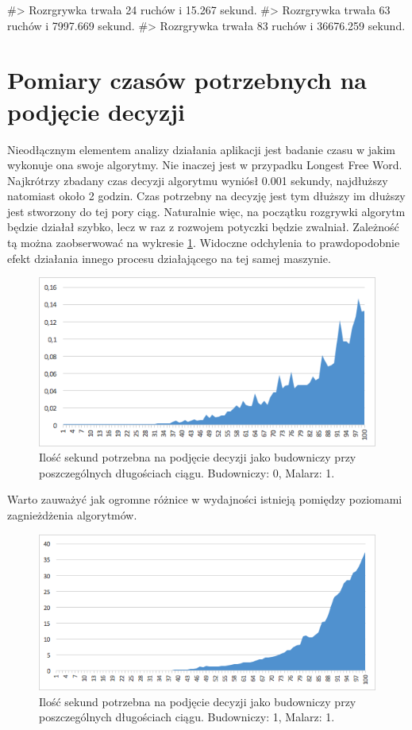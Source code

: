 \documentclass[document]{xmgr}
\begin{document}
#> Rozrgrywka trwała 24 ruchów i 15.267 sekund.
#> Rozrgrywka trwała 63 ruchów i 7997.669 sekund.
#> Rozrgrywka trwała 83 ruchów i 36676.259 sekund.

\fi

\section{Pomiary czasów potrzebnych na podjęcie decyzji}
Nieodłącznym elementem analizy działania aplikacji jest badanie czasu w jakim wykonuje ona swoje algorytmy. Nie inaczej jest w przypadku Longest Free Word. Najkrótrzy zbadany czas decyzji algorytmu wyniósł 0.001 sekundy, najdłuższy natomiast około 2 godzin. Czas potrzebny na decyzję jest tym dłuższy im dłuższy jest stworzony do tej pory ciąg. Naturalnie więc, na początku rozgrywki algorytm będzie działał szybko, lecz w raz z rozwojem potyczki będzie zwalniał. Zależność tą można zaobserwować na wykresie \ref{fig:builder0painter1}. Widoczne odchylenia to prawdopodobnie efekt działania innego procesu działającego na tej samej maszynie.

\begin{figure}[H]
    \centering
    \includegraphics[scale = 0.7]{images/timeBuilder0Painter1}
    \caption{Ilość sekund potrzebna na podjęcie decyzji jako budowniczy przy poszczególnych długościach ciągu. Budowniczy: 0, Malarz: 1.}
    \label{fig:builder0painter1}
\end{figure}

Warto zauważyć jak ogromne różnice w wydajności istnieją pomiędzy poziomami zagnieżdżenia algorytmów.

\begin{figure}[h]
    \centering
    \includegraphics[scale = 0.7]{images/timeBuilder1Painter1}
    \caption{Ilość sekund potrzebna na podjęcie decyzji jako budowniczy przy poszczególnych długościach ciągu. Budowniczy: 1, Malarz: 1.}
    \label{fig:builder1painter1}
\end{figure}
\end{document}
